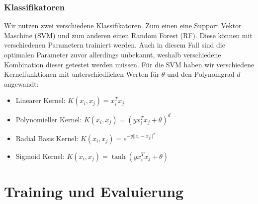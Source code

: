 \subsubsection{Klassifikatoren}
Wir nutzen zwei verschiedene Klassifikatoren. Zum einen eine Support Vektor Maschine (SVM) und zum anderen einen Random Forest (RF).
Diese können mit verschiedenen Parametern trainiert werden. Auch in diesem Fall sind die optimalen Parameter zuvor allerdings unbekannt,
weshalb verschiedene Kombination dieser getestet werden müssen.\newline
Für die SVM haben wir verschiedene Kernelfunktionen mit unterschiedlichen
Werten für $\theta$ und den Polynomgrad $d$ angewandt:
\begin{multicols}{2}
\begin{itemize}
  \item Linearer Kernel: $K(x_i,x_j) = x_i^Tx_j$
  \item Polynomieller Kernel: $K(x_i,x_j) = (yx_i^Tx_j + \theta)^{d}$
  \item Radial Basis Kernel: $K(x_i,x_j) = e^{-y||x_i-x_j||^2}$
  \item Sigmoid Kernel: $K(x_i,x_j) = \tanh(yx_i^Tx_j + \theta)$
\end{itemize}
\end{multicols}



\section{Training und Evaluierung}
